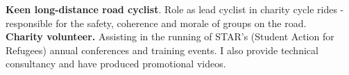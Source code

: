 \documentclass[11pt]{article}
\begin{document}
\textbf{Keen long-distance road cyclist}. Role as lead cyclist in charity cycle rides - responsible for the safety, coherence and morale of groups on the road.\\
\noindent \textbf{Charity volunteer.} Assisting in the running of STAR's (Student Action for Refugees) annual conferences and training events.
I also provide technical consultancy and have produced promotional videos.

\end{document}
